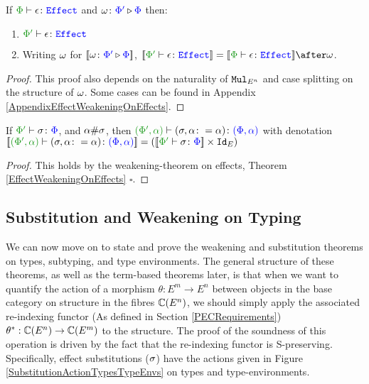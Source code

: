 \begin{framed}
    \begin{theorem}\label{EffectWeakeningOnEffects}
       If $\wellformedeffect{\P}{\e}$ and $\omega \colon {\color{blue}\Phi'} \triangleright {\color {blue} \Phi}$ then: 
       \begin{enumerate}[label=\roman*.]
           \item $\wellformedeffect{\P'}{\e}$
           \item Writing $\omega$ for ${\bf [\![}\omega \colon {\color{blue}\Phi'} \triangleright {\color {blue} \Phi}{\bf ]\!]}$,  $\deno{\wellformedeffect{\P'}{\e}} = \deno{\wellformedeffect{\P}{\e}}\after\w$.
       \end{enumerate}    
    \end{theorem}
    
    \begin{proof}
        This proof also depends on the naturality of $\texttt{Mul}_{E^n}$ and case splitting on the structure of $\omega$.  Some cases can be found in Appendix \ref{AppendixEffectWeakeningOnEffects}.
    \end{proof}
\end{framed}


\begin{framed}
    \begin{lemma}\label{ExtensionLemmaOnEffectSubstitutions}
        If $\typerelation{\P'}{\si}{\P}$, and $\alpha\#\sigma$, then $\typerelation{(\P', \a)}{(\si, \a\setto\a)}{(\P,\a)}$ with denotation $\deno{\typerelation{(\P', \a)}{(\si, \a\setto\a)}{(\P,\a)}} = (\deno{\typerelation{\P'}{\si}{\P}}\times\Id{E})$
    \end{lemma}
    \begin{proof}
       This holds by the weakening-theorem on effects, Theorem \ref{EffectWeakeningOnEffects} $\square$.
    \end{proof}
\end{framed}


\subsection{Substitution and Weakening on Typing}
We can now move on to state and prove the weakening and substitution theorems on types, subtyping, and type environments. The general structure of these theorems, as well as the term-based theorems later, is that when we want to quantify the action of a morphism $\theta: E^m \rightarrow E^n$ between objects in the base category on structure in the fibres $\mathbb{C}(E^n)$, we should simply apply the associated re-indexing functor (As defined in Section \ref{PECRequirements}) $\theta^*: \mathbb{C}(E^n) \rightarrow \mathbb{C}(E^m)$ to the structure. The proof of the soundness of this operation is driven by the fact that the re-indexing functor is S-preserving. Specifically, effect substitutions ($\sigma$) have the actions given in Figure \ref{SubstitutionActionTypesTypeEnvs} on types and type-environments.

